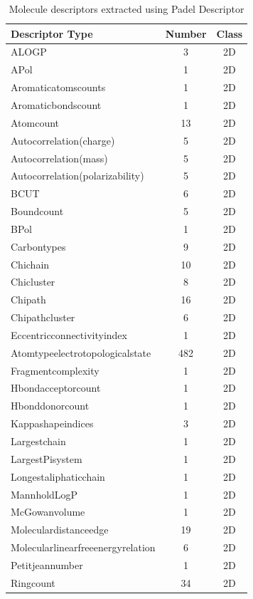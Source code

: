 \documentclass[conference,compsoc,12pt]{IEEEtran}
\begin{document}
	\begin{table}
	\renewcommand{\arraystretch}{1.1}
	\caption{Molecule descriptors extracted using Padel Descriptor}
	\label{table_molecule_descriptors}
	\centering
	\begin{tabular}{|l|c|c|}
		\hline 
		Descriptor Type & Number
		& Class \\ 
		\hline 
		ALOGP & 	3  & 2D \\
		APol & 	1  & 2D \\
		Aromaticatomscounts & 	1  & 2D \\
		Aromaticbondscount & 	1  & 2D \\
		Atomcount & 	13  & 2D \\
		Autocorrelation(charge) & 	5  & 2D \\
		Autocorrelation(mass) & 	5  & 2D \\
		Autocorrelation(polarizability) & 	5  & 2D \\
		BCUT & 	6  & 2D \\
		Boundcount & 	5  & 2D \\
		BPol & 	1  & 2D \\
		Carbontypes & 	9  & 2D \\
		Chichain & 	10  & 2D \\
		Chicluster & 	8  & 2D \\
		Chipath & 	16  & 2D \\
		Chipathcluster & 	6  & 2D \\
		Eccentricconnectivityindex & 	1  & 2D \\
		Atomtypeelectrotopologicalstate & 	482  & 2D \\
		Fragmentcomplexity & 	1  & 2D \\
		Hbondacceptorcount & 	1  & 2D \\
		Hbonddonorcount & 	1  & 2D \\
		Kappashapeindices & 	3  & 2D \\
		Largestchain & 	1  & 2D \\
		LargestPisystem & 	1  & 2D \\
		Longestaliphaticchain & 	1  & 2D \\
		MannholdLogP & 	1  & 2D \\
		McGowanvolume & 	1  & 2D \\
		Moleculardistanceedge & 	19  & 2D \\
		Molecularlinearfreeenergyrelation & 	6  & 2D \\
		Petitjeannumber & 	1  & 2D \\
		Ringcount & 	34  & 2D \\

\end{tabular}
\end{table}
\end{document}
